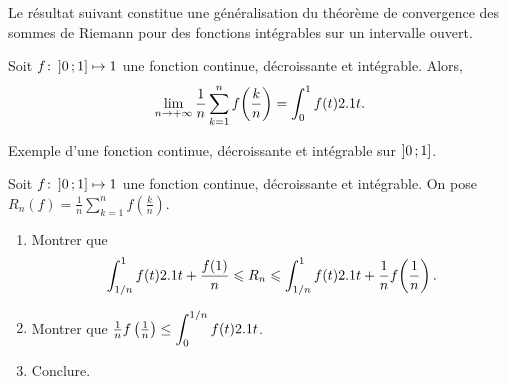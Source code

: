 


\medskip

Le résultat suivant constitue une généralisation du théorème de convergence des sommes de Riemann pour des fonctions intégrables sur un intervalle ouvert.

\begin{prop}
    Soit $\fonctionligne[f]{\interof{0}{1}}{\R}$ une fonction continue, décroissante et intégrable. Alors,
    \[
    \lim\limits_{n \to +\infty} \frac{1}{n} \sum\limits_{k=1}^n f\mathopen{}\left(\frac{k}{n}\right) =\int_0^1 f(t) \d t.
    \]
\end{prop}

\begin{marginfigure}
    \centering
    
    \caption{Exemple d'une fonction continue, décroissante et intégrable sur $\interof{0}{1}$.}
\end{marginfigure}

\begin{exercice}
Soit $\fonctionligne[f]{\interof{0}{1}}{\R}$ une fonction continue, décroissante et intégrable. On pose $R_n(f) = \frac{1}{n} \sum\limits_{k=1}^n f\left(\frac{k}{n}\right)$.
\begin{enumerate}
\item Montrer que
\[
\displaystyle\int_{1/n}^1 f(t) \d t + \frac{f(1)}{n}
\leqslant R_n
\leqslant \displaystyle\int_{1/n}^1 f(t) \d t + \frac{1}{n}  f\mathopen{}\left(\frac{1}{n}\right).
\]

\item Montrer que $\frac{1}{n} f\left(\frac{1}{n}\right) \leq \displaystyle\int_0^{1/n} f(t) \d t$.

\item Conclure.
\end{enumerate}
\end{exercice}



